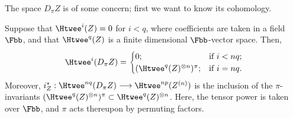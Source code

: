 The space $D_\pi Z$ is of some concern; first we want to know its cohomology.
\begin{lem}\label{lemaboutpiadic}
Suppose that $\Htwee^i (Z) = 0$ for $i < q$, where coefficients are taken in a field $\Fbb$, and that $\Htwee^q (Z)$ is a finite dimensional $\Fbb$-vector space.  Then,
\[\Htwee^i(D_\pi Z)=
\begin{cases}0;&\textup{if }i<nq;\\(\Htwee^q(Z)^{\otimes n})^\pi;&\textup{if }i=nq.%
\end{cases}
\]
Moreover, $i_Z^*:\Htwee^{nq}(D_\pi Z)\to \Htwee^{np}(Z^{(n)})$ is the inclusion of the $\pi$-invariants $(\Htwee^q(Z)^{\otimes n})^\pi\subset\Htwee^q(Z)^{\otimes n}$. Here, the tensor power is taken over $\Fbb$, and $\pi$ acts thereupon by permuting factors.
\end{lem}
